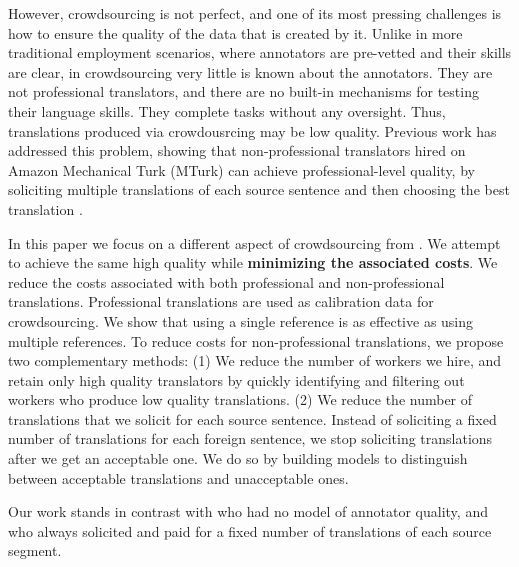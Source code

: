 \documentclass[11pt,letterpaper]{article}
\begin{document}
However, crowdsourcing is not perfect, and one of its most pressing challenges is how to ensure the quality of the data that is created by it.  Unlike in more traditional employment scenarios, where annotators are pre-vetted and their skills are clear, in crowdsourcing very little is known about the annotators.  They are not professional translators, and there are no built-in mechanisms for testing their language skills.  They complete tasks without any oversight. Thus, translations produced via crowdousrcing may be low quality.
Previous work has addressed this problem, showing that non-professional translators hired on Amazon Mechanical Turk (MTurk) can achieve professional-level quality, by soliciting multiple translations of each source sentence and then choosing the best translation \cite{zaidan-callisonburch:2011:ACL-HLT2011a}.

In this paper we focus on a different aspect of crowdsourcing from .  We attempt to achieve the same high quality while {\bf minimizing the associated costs}.  
We reduce the costs associated with both professional and non-professional translations. Professional translations are used as calibration data for crowdsourcing. We show that using a single reference is as effective as using multiple references.
To  reduce costs for non-professional translations, we propose two complementary methods: (1) We reduce the number of workers we hire, and retain only high quality translators by quickly identifying and filtering out workers who produce low quality translations. 
(2) We reduce the number of translations that we solicit for each source sentence. Instead of soliciting a fixed number of translations for each foreign sentence, we stop soliciting translations after we get an acceptable one.  We do so by building models to distinguish between acceptable translations and unacceptable ones.  

Our work stands in contrast with   who had no model of annotator quality, and who always solicited and paid for a fixed number of translations of each source segment. 
 
\end{document}

